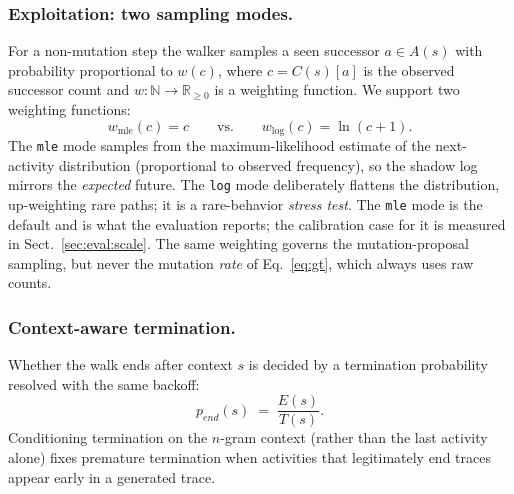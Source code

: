 \documentclass[runningheads]{llncs}
\newcommand{\pend}{\ensuremath{p_{\mathit{end}}}}
\begin{document}
\subsubsection{Exploitation: two sampling modes.}
For a non-mutation step the walker samples a seen successor $a\in A(s)$ with probability proportional to $w(c)$, where $c=C(s)[a]$ is the observed successor count and $w:\mathbb{N}\to\mathbb{R}_{\ge0}$ is a weighting function. We support two weighting functions:
\begin{equation}
w_{\mathrm{mle}}(c)=c \qquad\text{vs.}\qquad w_{\mathrm{log}}(c)=\ln(c+1).
\end{equation}
The \texttt{mle} mode samples from the maximum-likelihood estimate of the next-activity distribution (proportional to observed frequency), so the shadow log mirrors the \emph{expected} future. The \texttt{log} mode deliberately flattens the distribution, up-weighting rare paths; it is a rare-behavior \emph{stress test}. The \texttt{mle} mode is the default and is what the evaluation reports; the calibration case for it is measured in Sect.~\ref{sec:eval:scale}. The same weighting governs the mutation-proposal sampling, but never the mutation \emph{rate} of Eq.~\eqref{eq:gt}, which always uses raw counts.

\subsubsection{Context-aware termination.}
Whether the walk ends after context $s$ is decided by a termination probability resolved with the same backoff:
\begin{equation}
\pend(s) \;=\; \frac{E(s)}{T(s)}.
\end{equation}
Conditioning termination on the $n$-gram context (rather than the last activity alone) fixes premature termination when activities that legitimately end traces appear early in a generated trace.
\end{document}
